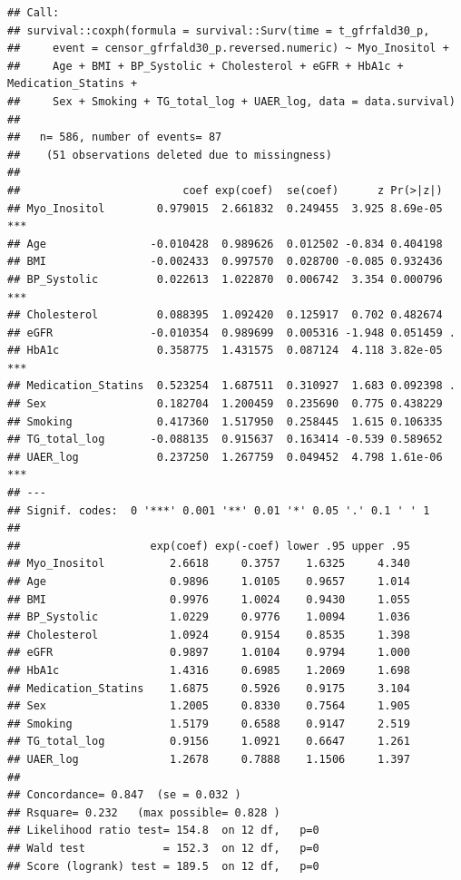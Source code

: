 \documentclass[]{article}
\begin{document}
\begin{verbatim}
## Call:
## survival::coxph(formula = survival::Surv(time = t_gfrfald30_p, 
##     event = censor_gfrfald30_p.reversed.numeric) ~ Myo_Inositol + 
##     Age + BMI + BP_Systolic + Cholesterol + eGFR + HbA1c + Medication_Statins + 
##     Sex + Smoking + TG_total_log + UAER_log, data = data.survival)
## 
##   n= 586, number of events= 87 
##    (51 observations deleted due to missingness)
## 
##                         coef exp(coef)  se(coef)      z Pr(>|z|)    
## Myo_Inositol        0.979015  2.661832  0.249455  3.925 8.69e-05 ***
## Age                -0.010428  0.989626  0.012502 -0.834 0.404198    
## BMI                -0.002433  0.997570  0.028700 -0.085 0.932436    
## BP_Systolic         0.022613  1.022870  0.006742  3.354 0.000796 ***
## Cholesterol         0.088395  1.092420  0.125917  0.702 0.482674    
## eGFR               -0.010354  0.989699  0.005316 -1.948 0.051459 .  
## HbA1c               0.358775  1.431575  0.087124  4.118 3.82e-05 ***
## Medication_Statins  0.523254  1.687511  0.310927  1.683 0.092398 .  
## Sex                 0.182704  1.200459  0.235690  0.775 0.438229    
## Smoking             0.417360  1.517950  0.258445  1.615 0.106335    
## TG_total_log       -0.088135  0.915637  0.163414 -0.539 0.589652    
## UAER_log            0.237250  1.267759  0.049452  4.798 1.61e-06 ***
## ---
## Signif. codes:  0 '***' 0.001 '**' 0.01 '*' 0.05 '.' 0.1 ' ' 1
## 
##                    exp(coef) exp(-coef) lower .95 upper .95
## Myo_Inositol          2.6618     0.3757    1.6325     4.340
## Age                   0.9896     1.0105    0.9657     1.014
## BMI                   0.9976     1.0024    0.9430     1.055
## BP_Systolic           1.0229     0.9776    1.0094     1.036
## Cholesterol           1.0924     0.9154    0.8535     1.398
## eGFR                  0.9897     1.0104    0.9794     1.000
## HbA1c                 1.4316     0.6985    1.2069     1.698
## Medication_Statins    1.6875     0.5926    0.9175     3.104
## Sex                   1.2005     0.8330    0.7564     1.905
## Smoking               1.5179     0.6588    0.9147     2.519
## TG_total_log          0.9156     1.0921    0.6647     1.261
## UAER_log              1.2678     0.7888    1.1506     1.397
## 
## Concordance= 0.847  (se = 0.032 )
## Rsquare= 0.232   (max possible= 0.828 )
## Likelihood ratio test= 154.8  on 12 df,   p=0
## Wald test            = 152.3  on 12 df,   p=0
## Score (logrank) test = 189.5  on 12 df,   p=0
\end{verbatim}
\end{document}
